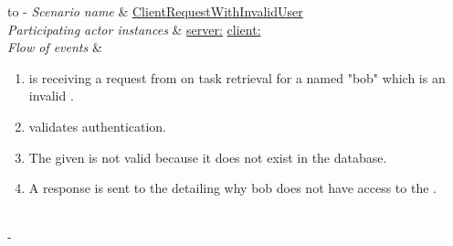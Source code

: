 %
%
\begin{table}[h!]
	\tabulinesep=1.5mm
	\begin{tabu} to 
		\tabucline[1.5pt]-
		\textit{Scenario name} & \underline{ClientRequestWithInvalidUser} \\
		\hline
		\textit{Participating actor \newline instances} & \underline{server:\serverside}
		\newline \underline{client:\clientside} \\
		\hline
		\textit{Flow of events} &
		\vspace{-3mm}
		\begin{enumerate}[leftmargin=*,topsep=0pt,itemsep=-1ex]
			\item \serverside is receiving a request from \clientside on task retrieval for a \user named "bob" which is an invalid \user.
			
			\item \serverside validates \user authentication. 
			
			\item The given \user is not valid because it does not exist in the database.
			
			\item A response is sent to the \clientside detailing why bob does not have access to the \system. \\				
		\end{enumerate} \\
		\tabucline[1.5pt]-
	\end{tabu}
		\caption{Scenario when a invalid user is trying to get access to the server.}
		\label{sc:ClientRequestWithInvalidUser}
\end{table}